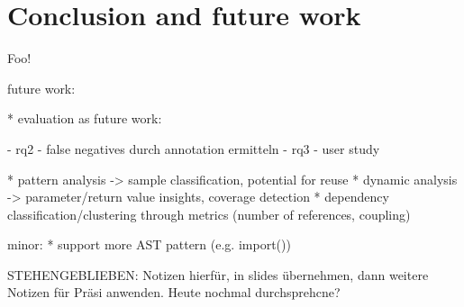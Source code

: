\section{Conclusion and future work}
\label{sec:conclusion}

Foo!

future work:

* evaluation as future work:

	- rq2 - false negatives durch annotation ermitteln
	- rq3 - user study

* pattern analysis -> sample classification, potential for reuse
* dynamic analysis -> parameter/return value insights, coverage detection
* dependency classification/clustering through metrics (number of references, coupling)

minor:
* support more AST pattern (e.g. import())

STEHENGEBLIEBEN: Notizen hierfür, in slides übernehmen, dann weitere Notizen für Präsi anwenden. Heute nochmal durchsprehcne?
